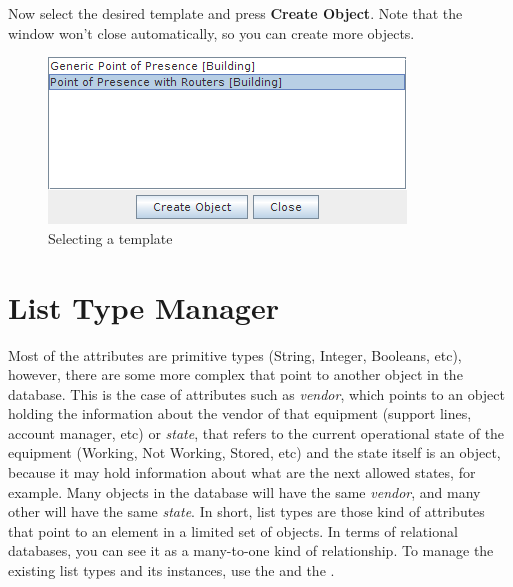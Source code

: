 \documentclass[a4paper]{article}
\begin{document}
	\newpage
	Now select the desired template and press \textbf{Create Object}. Note that the window won't close automatically, so you can create more objects.
	\begin{figure}[h!]
		\centering
		\includegraphics[width=0.6\linewidth]{img/template_manager_select_template.png}
		\caption{Selecting a template}
		\label{fig:template_manager_select_template}
	\end{figure}
	
	\newpage
	\section{List Type Manager} \label{sec:list_type_manager}
	Most of the attributes are primitive types (String, Integer, Booleans, etc), however, there are some more complex that point to another object in the database. This is the case of attributes such as \textit{vendor}, which points to an object holding the information about the vendor of that equipment (support lines, account manager, etc) or \textit{state}, that refers to the current operational state of the equipment (Working, Not Working, Stored, etc) and the state itself is an object, because it may hold information about what are the next allowed states, for example. Many objects in the database will have the same \textit{vendor}, and many other will have the same \textit{state}. In short, list types are those kind of attributes that point to an element in a limited set of objects. In terms of relational databases, you can see it as a many-to-one kind of relationship. To manage the existing list types and its instances, use the \textbf{} and the \textbf{}. \newline
	
\end{document}
